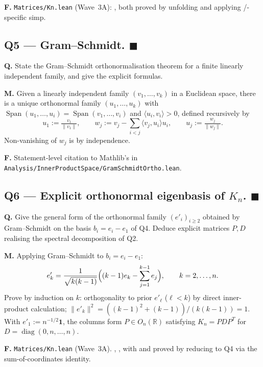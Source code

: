 \documentclass[11pt,a4paper]{article}
\newcommand{\done}[1]{\textcolor{donegreen}{\textbf{#1}}}
\newcommand{\lmod}[1]{\texttt{\small #1}}
\newcommand{\R}{\mathbb{R}}
\newcommand{\Span}{\operatorname{Span}}
\newcommand{\diag}{\operatorname{diag}}
\theoremstyle{plain}
\theoremstyle{definition}
\begin{document}
\textbf{F.} \lmod{Matrices/Kn.lean} (Wave~3A):
,  both
proved by unfolding  and applying
/-specific simp.

\subsection{Q5 --- Gram--Schmidt. \done{$\blacksquare$}}

\textbf{Q.} State the Gram--Schmidt orthonormalisation theorem for
a finite linearly independent family, and give the explicit
formulas.

\textbf{M.} Given a linearly independent family $(v_1, \ldots, v_k)$
in a Euclidean space, there is a unique orthonormal family
$(u_1, \ldots, u_k)$ with $\Span(u_1, \ldots, u_i) =
\Span(v_1, \ldots, v_i)$ and $\langle u_i, v_i\rangle > 0$, defined
recursively by
\[
u_1 := \tfrac{v_1}{\|v_1\|}, \qquad
w_j := v_j - \sum_{i<j} \langle v_j, u_i\rangle u_i, \qquad
u_j := \tfrac{w_j}{\|w_j\|}.
\]
Non-vanishing of $w_j$ is by independence.

\textbf{F.} Statement-level citation to Mathlib's
 in
\lmod{Analysis/InnerProductSpace/GramSchmidtOrtho.lean}.

\subsection{Q6 --- Explicit orthonormal eigenbasis of $K_n$. \done{$\blacksquare$}}

\textbf{Q.} Give the general form of the orthonormal family
$(e'_i)_{i \geq 2}$ obtained by Gram--Schmidt on the basis
$b_i = e_i - e_1$ of Q4. Deduce explicit matrices $P, D$
realising the spectral decomposition of Q2.

\textbf{M.} Applying Gram--Schmidt to $b_i = e_i - e_1$:
\[
e'_k = \frac{1}{\sqrt{k(k-1)}}\Bigl((k-1) e_k - \sum_{j=1}^{k-1} e_j\Bigr),
\qquad k = 2, \ldots, n.
\]
Prove by induction on $k$: orthogonality to prior $e'_\ell$ ($\ell < k$)
by direct inner-product calculation; $\|e'_k\|^2 = ((k-1)^2 + (k-1))/
(k(k-1)) = 1$. With $e'_1 := n^{-1/2} \mathbf 1$, the columns form
$P \in O_n(\R)$ satisfying $K_n = P D P^T$ for
$D = \diag(0, n, \ldots, n)$.

\textbf{F.} \lmod{Matrices/Kn.lean} (Wave~3A).
, , with
 and  proved by
reducing to Q4 via the sum-of-coordinates identity.
\end{document}
